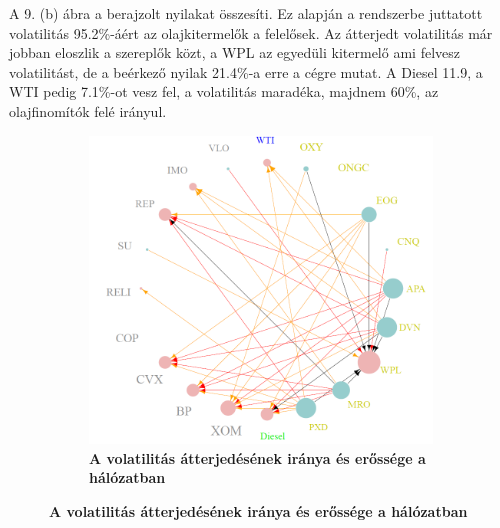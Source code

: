 \documentclass[12pt,bibliography=totoc]{article}
\begin{document}
A 9. (b) ábra a berajzolt nyilakat összesíti. Ez alapján a rendszerbe juttatott volatilitás 95.2\%-áért az olajkitermelők a felelősek. Az átterjedt volatilitás már jobban eloszlik a szereplők közt, a WPL az egyedüli kitermelő ami felvesz volatilitást, de a beérkező nyilak 21.4\%-a erre a cégre mutat. A Diesel 11.9, a WTI pedig 7.1\%-ot vesz fel, a volatilitás maradéka, majdnem 60\%, az olajfinomítók felé irányul.

\begin{figure}[H]
\centering
\caption{Statikus összekötöttség a hálózatban}
\begin{subfigure}{.5\linewidth}
\centering
\includegraphics[width=\linewidth]{static_net2}
\caption{\textbf{A volatilitás átterjedésének iránya és erőssége a hálózatban}}


\end{subfigure}
\end{figure}
\end{document}
